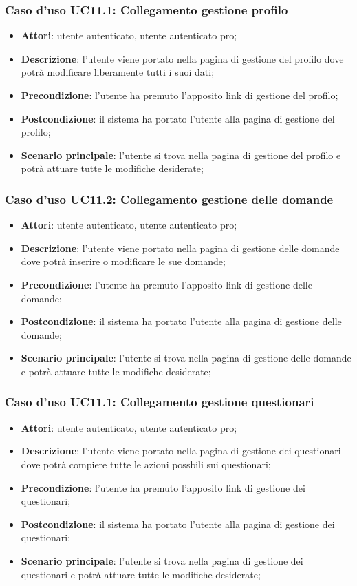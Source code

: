 \subsubsection{Caso d'uso UC11.1: Collegamento gestione profilo}
\begin{itemize}
\item\textbf{Attori}: utente autenticato, utente autenticato pro;
\item\textbf{Descrizione}: l'utente viene portato nella pagina di gestione del profilo dove potrà modificare liberamente tutti i suoi dati;
\item\textbf{Precondizione}: l'utente ha premuto l'apposito link di gestione del profilo;
\item\textbf{Postcondizione}: il sistema ha portato l'utente alla pagina di gestione del profilo;
\item\textbf{Scenario principale}: l'utente si trova nella pagina di gestione del profilo e potrà attuare tutte le modifiche desiderate;
\end{itemize}

\subsubsection{Caso d'uso UC11.2: Collegamento gestione delle domande}
\begin{itemize}
\item\textbf{Attori}: utente autenticato, utente autenticato pro;
\item\textbf{Descrizione}: l'utente viene portato nella pagina di gestione delle domande dove potrà inserire o modificare le sue domande;
\item\textbf{Precondizione}: l'utente ha premuto l'apposito link di gestione delle domande;
\item\textbf{Postcondizione}: il sistema ha portato l'utente alla pagina di gestione delle domande;
\item\textbf{Scenario principale}: l'utente si trova nella pagina di gestione delle domande e potrà attuare tutte le modifiche desiderate;
\end{itemize}

\subsubsection{Caso d'uso UC11.1: Collegamento gestione questionari}
\begin{itemize}
\item\textbf{Attori}: utente autenticato, utente autenticato pro;
\item\textbf{Descrizione}: l'utente viene portato nella pagina di gestione dei questionari dove potrà compiere tutte le azioni possbili sui questionari;
\item\textbf{Precondizione}: l'utente ha premuto l'apposito link di gestione dei questionari;
\item\textbf{Postcondizione}: il sistema ha portato l'utente alla pagina di gestione dei questionari;
\item\textbf{Scenario principale}: l'utente si trova nella pagina di gestione dei questionari e potrà attuare tutte le modifiche desiderate;
\end{itemize}